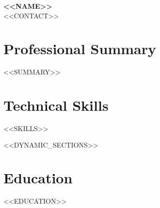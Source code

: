 \documentclass[10pt, letterpaper]{article}
\begin{document}
\begin{center}
    {\Huge \textbf{<<NAME>>}} \\ \vspace{4pt}
    <<CONTACT>>
\end{center}

\section{Professional Summary}
<<SUMMARY>>

\section{Technical Skills}
\begin{itemize}[leftmargin=0.15in, label={}, itemsep=-2pt]
<<SKILLS>>
\end{itemize}

<<DYNAMIC_SECTIONS>>

\section{Education}
<<EDUCATION>>
\end{document}
